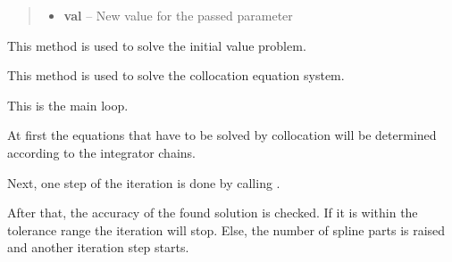 \documentclass[letterpaper,10pt,english]{sphinxmanual}
\begin{document}
\begin{fulllineitems}
\begin{fulllineitems}
\begin{quote}
\begin{description}
\begin{itemize}
\item {} 
\textbf{val} -- New value for the passed parameter

\end{itemize}

\end{description}\end{quote}

\end{fulllineitems}


\begin{fulllineitems}
\label{pytrajectory:pytrajectory.trajectory.Trajectory.simulateIVP}
This method is used to solve the initial value problem.

\end{fulllineitems}


\begin{fulllineitems}
\label{pytrajectory:pytrajectory.trajectory.Trajectory.solveEQS}
This method is used to solve the collocation equation system.

\end{fulllineitems}


\begin{fulllineitems}
\label{pytrajectory:pytrajectory.trajectory.Trajectory.startIteration}
This is the main loop.

At first the equations that have to be solved by collocation will be determined according to
the integrator chains.

Next, one step of the iteration is done by calling {\hyperref[pytrajectory:pytrajectory.trajectory.Trajectory.iterate]{}}.

After that, the accuracy of the found solution is checked. If it is within the tolerance
range the iteration will stop. Else, the number of spline parts is raised and another
iteration step starts.

\end{fulllineitems}



\end{fulllineitems}
\end{document}
